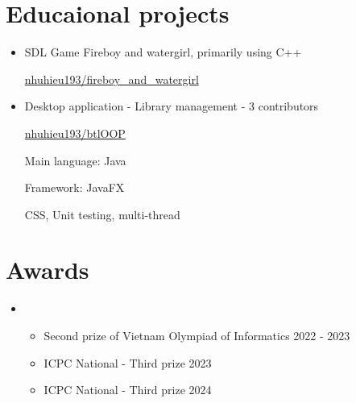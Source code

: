 \documentclass[letterpaper,11pt]{article}
\newcommand{\cvitem}[1]{
  \item\small{
    {#1\vspace{-2pt}}
  }
}
\newcommand{\cvheadingstart}{\begin{itemize}[leftmargin=0in, label={}]}
\newcommand{\cvheadingend}{\end{itemize}}
\newcommand{\cvitemstart}{\begin{itemize}\justifying}
\newcommand{\cvitemend}{\end{itemize}\vspace{-5pt}}
\begin{document}
\section{Educaional projects}
\cvitemstart
    \cvitem {SDL Game Fireboy and watergirl, primarily using C++\hfill}
    \href{https://github.com/nhuhieu193/fireboy_and_watergirl}{nhuhieu193/fireboy\_and\_watergirl}
    \cvitem {Desktop application - Library management - 3 contributors\hfill}
    \href{https://github.com/nhuhieu193/btlOOP}{nhuhieu193/btlOOP}

    Main language: Java
    
    Framework: JavaFX

    CSS, Unit testing, multi-thread
    
\cvitemend

\section{Awards}
\cvheadingstart
\item
\cvitemstart
  \cvitem{Second prize of Vietnam Olympiad of Informatics\hfill}{2022 - 2023}
  \cvitem{ICPC National - Third prize \hfill}{2023}
  \cvitem{ICPC National - Third prize \hfill}{2024}
\cvitemend
\cvheadingend
\end{document}
